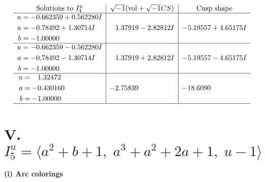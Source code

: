\documentclass[1p]{elsarticle_modified}
\theoremstyle{definition}
\newcommand{\I}{\sqrt{-1}}
\begin{document}
$$\begin{array}{c|c|c}  
\text{Solutions to }I^u_{4}& \I (\text{vol} + \sqrt{-1}CS) & \text{Cusp shape}\\
 \hline 
\begin{aligned}
u &= -0.662359 + 0.562280 I \\
a &= -0.78492 + 1.30714 I \\
b &= -1.00000\phantom{ +0.000000I}\end{aligned}
 & \phantom{-}1.37919 - 2.82812 I & -5.19557 + 4.65175 I \\ \hline\begin{aligned}
u &= -0.662359 - 0.562280 I \\
a &= -0.78492 - 1.30714 I \\
b &= -1.00000\phantom{ +0.000000I}\end{aligned}
 & \phantom{-}1.37919 + 2.82812 I & -5.19557 - 4.65175 I \\ \hline\begin{aligned}
u &= \phantom{-}1.32472\phantom{ +0.000000I} \\
a &= -0.430160\phantom{ +0.000000I} \\
b &= -1.00000\phantom{ +0.000000I}\end{aligned}
 & -2.75839\phantom{ +0.000000I} & -18.6090\phantom{ +0.000000I}\\
 \hline 
 \end{array}$$\newpage\newpage\renewcommand{\arraystretch}{1}
\centering \section*{V. $I^u_{5}= \langle a^2+b+1,\;a^3+a^2+2 a+1,\;u-1 \rangle$}
\flushleft \textbf{(i) Arc colorings}\\
\end{document}
